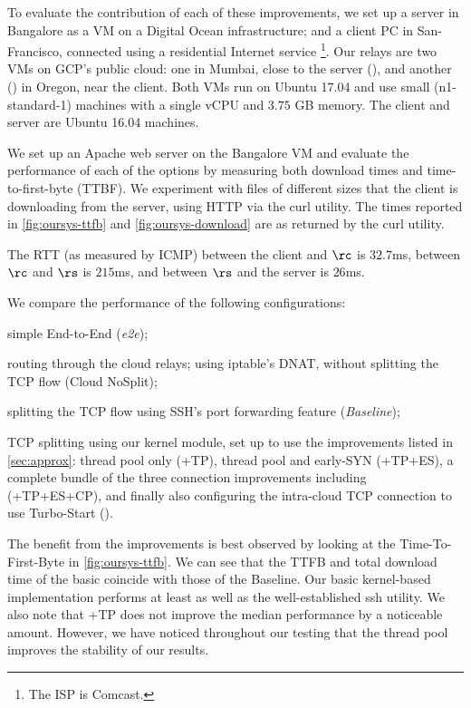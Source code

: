 To evaluate the contribution of each of these improvements, we set up a server in Bangalore as a VM on a Digital Ocean infrastructure; and a client PC in San-Francisco, connected using a residential Internet service \footnote{The ISP is Comcast.}. Our relays are two VMs on GCP's public cloud: one in Mumbai, close to the server (\rs), and another (\rc)  in Oregon, near the client. Both VMs run on Ubuntu 17.04 and use small (n1-standard-1) machines with a single vCPU and $3.75$ GB memory. The client and server are Ubuntu 16.04 machines.

We set up an Apache web server on the Bangalore VM and evaluate the performance of each of the options by measuring both download times and time-to-first-byte (TTBF). We experiment with files of different sizes that the client is downloading from the server, using HTTP via the curl utility. The times reported in \autoref{fig:oursys-ttfb} and \autoref{fig:oursys-download}  are as returned by the curl utility.

The RTT  (as measured by ICMP) between the client and $\rc$ is $32.7$ms, between $\rc$ and $\rs$ is $215$ms, and between $\rs$ and the server is $26$ms.

We compare the performance of the following configurations: \begin{romanlist}
     \item simple End-to-End (\textit{e2e});
     \item routing through the cloud relays; using iptable's DNAT, without splitting the TCP flow (Cloud NoSplit);
     \item splitting the TCP flow using SSH's port forwarding feature (\textit{Baseline});
     \item TCP splitting using our \oursys kernel module, set up to use the improvements listed in \autoref{sec:approx}: thread pool only (\oursys+TP), thread pool and early-SYN (\oursys+TP+ES), a complete bundle of the three connection improvements including \reconn (\oursys+TP+ES+CP), and finally also configuring the intra-cloud TCP connection to use Turbo-Start (\textit{\oursys}).
\end{romanlist}

The benefit from the improvements is best observed by looking at the Time-To-First-Byte in \autoref{fig:oursys-ttfb}. We can see that the  TTFB and total download time of the basic \oursys coincide with those of the Baseline. Our basic kernel-based implementation performs at least as well as the well-established ssh utility. We also note that \oursys+TP does not improve the median performance by a noticeable amount. However, we have noticed throughout our testing that the thread pool improves the stability of our results.

